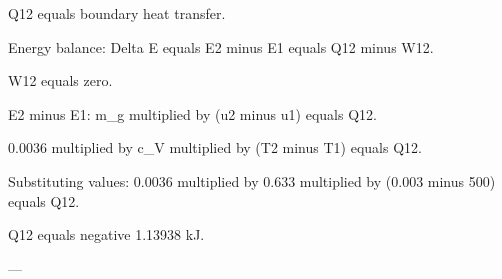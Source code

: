 Q12 equals boundary heat transfer.  

Energy balance:  
Delta E equals E2 minus E1 equals Q12 minus W12.  

W12 equals zero.  

E2 minus E1:  
m_g multiplied by (u2 minus u1) equals Q12.  

0.0036 multiplied by c_V multiplied by (T2 minus T1) equals Q12.  

Substituting values:  
0.0036 multiplied by 0.633 multiplied by (0.003 minus 500) equals Q12.  

Q12 equals negative 1.13938 kJ.  

---